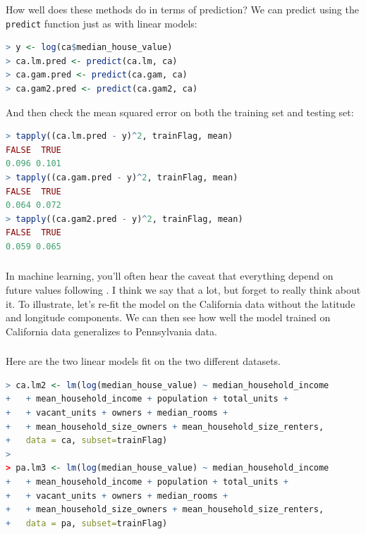 \documentclass[xetex,mathserif,serif,aspectratio=169]{beamer}
\begin{document}
\begin{frame}[fragile] \frametitle{} \oldB \small

How well does these methods do in terms of prediction? We can
predict using the \texttt{predict} function just as with linear
models:
\begin{lstlisting}[language=R, basicstyle=\fontsize{8pt}{10pt}\selectfont\ttfamily]
> y <- log(ca$median_house_value)
> ca.lm.pred <- predict(ca.lm, ca)
> ca.gam.pred <- predict(ca.gam, ca)
> ca.gam2.pred <- predict(ca.gam2, ca)
\end{lstlisting}
And then check the mean squared error on both the
training set and testing set:
\begin{lstlisting}[language=R, basicstyle=\fontsize{8pt}{10pt}\selectfont\ttfamily]
> tapply((ca.lm.pred - y)^2, trainFlag, mean)
FALSE  TRUE
0.096 0.101
> tapply((ca.gam.pred - y)^2, trainFlag, mean)
FALSE  TRUE
0.064 0.072
> tapply((ca.gam2.pred - y)^2, trainFlag, mean)
FALSE  TRUE
0.059 0.065
\end{lstlisting}

\end{frame}


\begin{frame}[fragile] \frametitle{} \oldB \small

In machine learning, you'll often hear the caveat that everything
depend on future values following .
I think we say that a lot, but forget to really think about it.
To illustrate, let's re-fit the model on the California data without
the latitude and longitude components. We can then see how well the
model trained on California data generalizes to Pennsylvania data.

\end{frame}

\begin{frame}[fragile] \frametitle{} \oldB \small

Here are the two linear models fit on the two different datasets.
\begin{lstlisting}[language=R, basicstyle=\fontsize{8pt}{10pt}\selectfont\ttfamily]
> ca.lm2 <- lm(log(median_house_value) ~ median_household_income
+   + mean_household_income + population + total_units +
+   + vacant_units + owners + median_rooms +
+   + mean_household_size_owners + mean_household_size_renters,
+   data = ca, subset=trainFlag)
>
> pa.lm3 <- lm(log(median_house_value) ~ median_household_income
+   + mean_household_income + population + total_units +
+   + vacant_units + owners + median_rooms +
+   + mean_household_size_owners + mean_household_size_renters,
+   data = pa, subset=trainFlag)
\end{lstlisting}

\end{frame}
\end{document}
